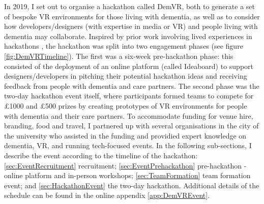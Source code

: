 In 2019, I set out to organise a hackathon called DemVR, both to generate a set of bespoke VR environments for those living with dementia, as well as to consider how developers/designers (with expertise in media or VR) and people living with dementia may collaborate. Inspired by prior work involving lived experiences in hackathons \citep{birbeck_self_2017}, the hackathon was split into two engagement phases (see figure \ref{fig:DemVRTimeline}). The first was a six-week pre-hackathon phase: this consisted of the deployment of an online platform (called Ideaboard) to support designers/developers in pitching their potential hackathon ideas and receiving feedback from people with dementia and care partners. The second phase was the two-day hackathon event itself, where participants formed teams to compete for £1000 and £500 prizes by creating prototypes of VR environments for people with dementia and their care partners. To accommodate funding for venue hire, branding, food and travel, I partnered up with several organisations in the city of the university who assisted in the funding and providied expert knowledge on dementia, VR, and running tech-focused events. In the following sub-sections, I describe the event according to the timeline of the hackathon: \ref{sec:EventRecruitment} recruitment; \ref{sec:EventPrehackathon} pre-hackathon - online platform and in-person workshops; \ref{sec:TeamFormation} team formation event; and \ref{sec:HackathonEvent} the two-day hackathon. Additional details of the schedule can be found in the online appendix \ref{app:DemVREvent}.

